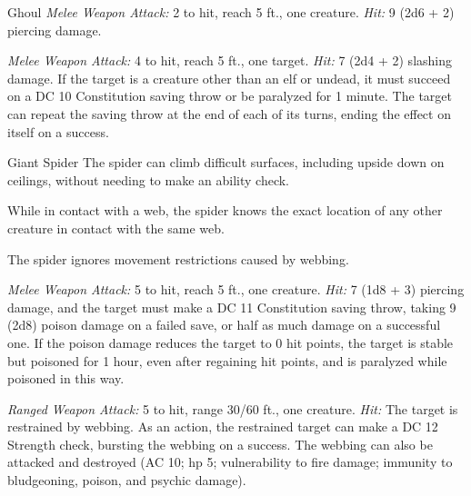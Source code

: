 \documentclass[10pt,a4paper,twoside,bg=print,twocolumn,openany,nodeprecatedcode]{dndbook}
\begin{document}
\begin{DndMonster}[float=t]{Ghoul}
\DndMonsterBasics[
armor-class = {12},
hit-points = {\DndDice{5d8}},
speed = {30 ft.}
]
\DndMonsterAbilityScores[
 str = 13,
 dex = 15,
 con = 10,
 int = 7,
 wis = 10,
 cha = 6
]
\DndMonsterDetails[
damage-immunities = {poison},
condition-immunities = {charmed, exhaustion, poisoned},
senses = {darkvision 60 ft., passive perception 10},
languages = {Common},
challenge = 1,
]
\textsl{Melee Weapon Attack:} 2 to hit, reach 5 ft., one creature. \textsl{Hit:} 9 (2d6 + 2) piercing damage.

\textsl{Melee Weapon Attack:} 4 to hit, reach 5 ft., one target. \textsl{Hit:} 7 (2d4 + 2) slashing damage. If the target is a creature other than an elf or undead, it must succeed on a DC 10 Constitution saving throw or be paralyzed for 1 minute. The target can repeat the saving throw at the end of each of its turns, ending the effect on itself on a success.

\end{DndMonster}



\begin{DndMonster}[float=t]{Giant Spider}
\DndMonsterBasics[
armor-class = {14 (natural armor)},
hit-points = {\DndDice{4d10 + 4}},
speed = {30 ft., climb 30 ft.}
]
\DndMonsterAbilityScores[
 str = 14,
 dex = 16,
 con = 12,
 int = 2,
 wis = 11,
 cha = 4
]
\DndMonsterDetails[
skills = {Stealth +7},
senses = {blindsight 10 ft., darkvision 60 ft., passive perception 10},
challenge = 1,
]
The spider can climb difficult surfaces, including upside down on ceilings, without needing to make an ability check.

While in contact with a web, the spider knows the exact location of any other creature in contact with the same web.

The spider ignores movement restrictions caused by webbing.

\textsl{Melee Weapon Attack:} 5 to hit, reach 5 ft., one creature. \textsl{Hit:} 7 (1d8 + 3) piercing damage, and the target must make a DC 11 Constitution saving throw, taking 9 (2d8) poison damage on a failed save, or half as much damage on a successful one. If the poison damage reduces the target to 0 hit points, the target is stable but poisoned for 1 hour, even after regaining hit points, and is paralyzed while poisoned in this way.

\textsl{Ranged Weapon Attack:} 5 to hit, range 30/60 ft., one creature. \textsl{Hit:} The target is restrained by webbing. As an action, the restrained target can make a DC 12 Strength check, bursting the webbing on a success. The webbing can also be attacked and destroyed (AC 10; hp 5; vulnerability to fire damage; immunity to bludgeoning, poison, and psychic damage).

\end{DndMonster}
\end{document}
